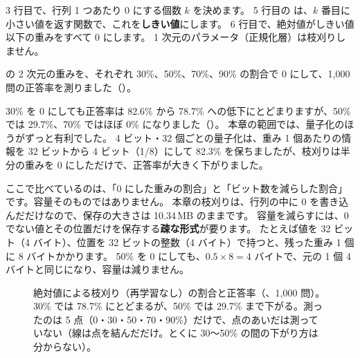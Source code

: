 
3 行目で、行列 1 つあたり 0 にする個数 $k$ を決めます。
5 行目の  は、$k$ 番目に小さい値を返す関数で、これを\textbf{しきい値}にします。
6 行目で、絶対値がしきい値以下の重みをすべて 0 にします。
1 次元のパラメータ（正規化層）は枝刈りしません。

 の 2 次元の重みを、それぞれ 30\%、50\%、70\%、90\% の割合で 0 にして、1,000 問の正答率を測りました（）。


30\% を 0 にしても正答率は 82.6\% から 78.7\% への低下にとどまりますが、50\% では 29.7\%、70\% ではほぼ 0\% になりました（）。
本章の範囲では、量子化のほうがずっと有利でした。
4 ビット・32 個ごとの量子化は、重み 1 個あたりの情報を 32 ビットから 4 ビット（1/8）にして 82.3\% を保ちましたが、枝刈りは半分の重みを 0 にしただけで、正答率が大きく下がりました。

ここで比べているのは、「0 にした重みの割合」と「ビット数を減らした割合」です。容量そのものではありません。
本章の枝刈りは、行列の中に 0 を書き込んだだけなので、保存の大きさは 10.34\,MB のままです。
容量を減らすには、0 でない値とその位置だけを保存する\textbf{疎な形式}が要ります。
たとえば値を 32 ビット（4 バイト）、位置を 32 ビットの整数（4 バイト）で持つと、残った重み 1 個に 8 バイトかかります。
50\% を 0 にしても、$0.5\times8=4$ バイトで、元の 1 個 4 バイトと同じになり、容量は減りません。

\begin{figure}[tbp]
\centering
{}
\caption{絶対値による枝刈り（再学習なし）の割合と正答率（、1,000 問）。30\% では 78.7\% にとどまるが、50\% では 29.7\% まで下がる。測ったのは 5 点（0・30・50・70・90\%）だけで、点のあいだは測っていない（線は点を結んだだけ。とくに 30〜50\% の間の下がり方は分からない）。}
\label{fig:prune}
\end{figure}

